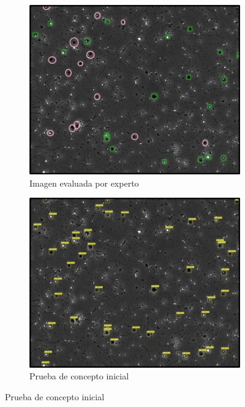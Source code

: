 \documentclass[12pt,a4paper,onecolumn,oneside]{report}
\begin{document}
\begin{figure}[H]
  \centering
  \begin{subfigure}[b]{0.48\textwidth}
    \centering
    \includegraphics[width=\textwidth]{figuras/evaluacion_cualitativa/139/139.jpg}
    \caption{Imagen evaluada por experto}
    \label{fig:exp_image_139}
  \end{subfigure}
  \hfill
  \begin{subfigure}[b]{0.48\textwidth}
    \centering
    \includegraphics[width=\textwidth]{figuras/evaluacion_cualitativa/139/139_v7.jpg}
    \caption{Prueba de concepto inicial}
    \label{fig:poc_image_139}
  \end{subfigure}
  

\end{figure}
\end{document}
